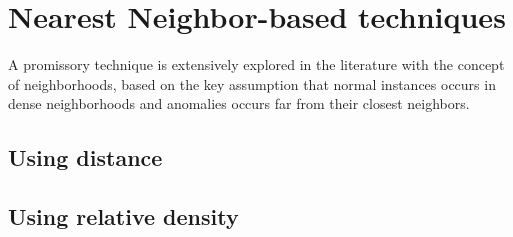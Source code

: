 \section{Nearest Neighbor-based techniques}
\label{sec:nnbased}

A promissory technique is extensively explored in the literature with the concept of neighborhoods, based on the key assumption that normal instances occurs in dense neighborhoods and anomalies occurs far from their closest neighbors.


\subsection{Using distance}

\cite{class:branch:2006} 

\subsection{Using relative density}
\lipsum[1]